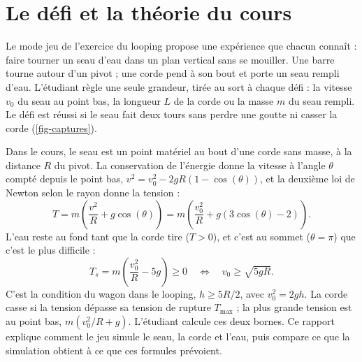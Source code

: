
\section{Le défi et la théorie du cours}

Le mode jeu de l'exercice du looping propose une expérience que chacun connaît :
faire tourner un seau d'eau dans un plan vertical sans se mouiller. Une barre
tourne autour d'un pivot ; une corde pend à son bout et porte un seau rempli
d'eau. L'étudiant règle une seule grandeur, tirée au sort à chaque défi : la
vitesse \(v_0\) du seau au point bas, la longueur \(L\) de la corde ou la masse
\(m\) du seau rempli. Le défi est réussi si le seau fait deux tours sans perdre
une goutte ni casser la corde (\cref{fig-captures}).

Dans le cours, le seau est un point matériel au bout d'une corde sans masse,
à la distance \(R\) du pivot. La conservation de l'énergie donne la vitesse à
l'angle \(\theta\) compté depuis le point bas,
\(v^2 = v_0^2 - 2 g R (1 - \cos(\theta))\), et la deuxième loi de Newton selon le
rayon donne la tension \cite{formulaire_epl1201} :
\begin{equation}
  T = m \left(\frac{v^2}{R} + g \cos(\theta)\right)
    = m \left(\frac{v_0^2}{R} + g \left(3 \cos(\theta) - 2\right)\right).
  \label{eq-tension}
\end{equation}
L'eau reste au fond tant que la corde tire (\(T > 0\)), et c'est au sommet
(\(\theta = \pi\)) que c'est le plus difficile :
\begin{equation}
  T_s = m \left(\frac{v_0^2}{R} - 5 g\right) \geq 0
  \quad \Longleftrightarrow \quad v_0 \geq \sqrt{5 g R} .
  \label{eq-sommet}
\end{equation}
C'est la condition du wagon dans le looping, \(h \geq 5R/2\), avec
\(v_0^2 = 2 g h\). La corde casse si la tension dépasse sa tension de rupture
\(T_{\max}\) ; la plus grande tension est au point bas,
\(m (v_0^2/R + g)\). L'étudiant calcule ces deux bornes. Ce rapport explique
comment le jeu simule le seau, la corde et l'eau, puis compare ce que la
simulation obtient à ce que ces formules prévoient.
